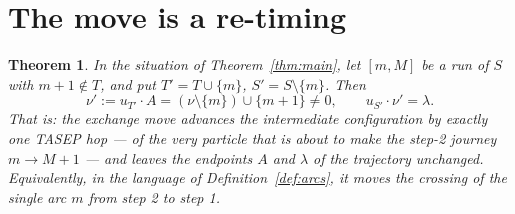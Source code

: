 \documentclass[11pt]{article}
\theoremstyle{plain}
\newtheorem{thm}{Theorem}[section]
\theoremstyle{definition}
\begin{document}
\section{The move is a re-timing}\label{sec:retime}

\begin{thm}\label{thm:retime}
In the situation of Theorem~\ref{thm:main}, let $[m,M]$ be a run of $S$ with $m+1\notin T$, and
put $T'=T\cup\{m\}$, $S'=S\setminus\{m\}$. Then
\[
  \nu':=u_{T'}\cdot A=(\nu\setminus\{m\})\cup\{m+1\}\ne0,
  \qquad u_{S'}\cdot\nu'=\lambda .
\]
That is: the exchange move advances the intermediate configuration by exactly one TASEP hop ---
of the very particle that is about to make the step-2 journey $m\to M+1$ --- and leaves the
endpoints $A$ and $\lambda$ of the trajectory unchanged. Equivalently, in the language of
Definition~\ref{def:arcs}, it moves the crossing of the single arc $m$ from step 2 to step 1.
\end{thm}
\end{document}
